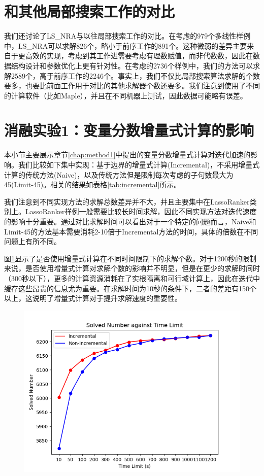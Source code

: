 \section{和其他局部搜索工作的对比}
我们还讨论了LS\_NRA与以往局部搜索工作的对比。在\cite{multilinear}考虑的979个多线性样例中，LS\_NRA可以求解826个，略小于前序工作的891个。这种微弱的差异主要来自于\cite{multilinear}更高效的实现，考虑到其工作进需要考虑有理数赋值，而非代数数，因此在数据结构设计和参数优化上更有针对性。在\cite{LiXZ23}考虑的2736个样例中，我们的方法可以求解2589个，高于前序工作的2246个。事实上，我们不仅比局部搜索算法求解的个数要多，也要比前面工作用于对比的其他求解器个数还要多。我们注意到\cite{LiXZ23}使用了不同的计算软件（比如Maple），并且在不同机器上测试，因此数据可能略有误差。

\section{消融实验1：变量分数增量式计算的影响}
本小节主要展示章节\ref{chap:method1}中提出的变量分数增量式计算对迭代加速的影响。我们比较如下集中实现：基于边界的增量式计算(Incremental)，不采用增量式计算的传统方法(Naive)，以及传统方法但是限制每次考虑的子句数最大为45(Limit-45)。相关的结果如表格\ref{tab:incremental}所示。

我们注意到不同实现方法的求解总数差异并不大，并且主要集中在LassoRanker类别上。LassoRanker样例一般需要比较长时间求解，因此不同实现方法对迭代速度的影响十分重要。通过对比求解时间可以看出对于一个特定的问题而言，Naive和Limit-45的方法基本需要消耗2-10倍于Incremental方法的时间，具体的倍数在不同问题上有所不同。

图\ref{fig:time_inc}显示了是否使用增量式计算在不同时间限制下的求解个数。对于1200秒的限制来说，是否使用增量式计算对求解个数的影响并不明显，但是在更少的求解时间时（300秒以下），更多的计算资源消耗在了实根隔离和可行域计算上，因此在迭代中缓存这些昂贵的信息尤为重要。在求解时间为10秒的条件下，二者的差距有150个以上，这说明了增量式计算对于提升求解速度的重要性。

\begin{figure}[t]
    \centering
    \includegraphics[width=\columnwidth]{Img/time_inc.png}
\label{fig:time_inc}
\end{figure}

